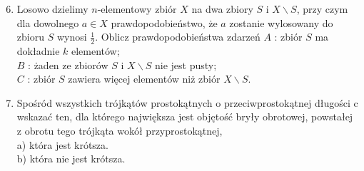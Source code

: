 \documentclass[10pt]{article}
\begin{document}
\begin{enumerate}
  \setcounter{enumi}{5}
  \item Losowo dzielimy $n$-elementowy zbiór $X$ na dwa zbiory $S$ i $X \backslash S$, przy czym dla dowolnego $a \in X$ prawdopodobieństwo, że $a$ zostanie wylosowany do zbioru $S$ wynosi $\frac{1}{2}$. Oblicz prawdopodobieństwa zdarzeń $A$ : zbiór $S$ ma dokładnie $k$ elementów;\\
$B$ : żaden ze zbiorów $S$ i $X \backslash S$ nie jest pusty;\\
$C$ : zbiór $S$ zawiera więcej elementów niż zbiór $X \backslash S$.
  \item Spośród wszystkich trójkątów prostokątnych o przeciwprostokątnej długości c wskazać ten, dla którego największa jest objętość bryły obrotowej, powstałej z obrotu tego trójkąta wokół przyprostokątnej,\\
a) która jest krótsza.\\
b) która nie jest krótsza.
\end{enumerate}
\end{document}

